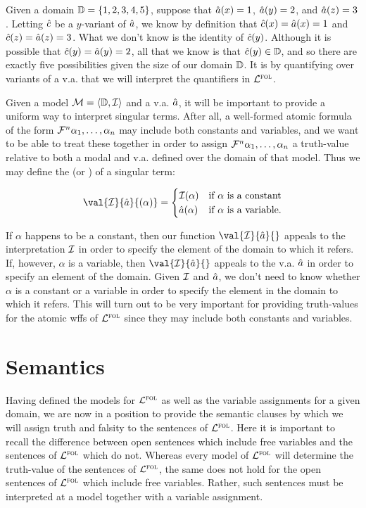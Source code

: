 Given a domain $\mathbb{D}=\lbrace1,2,3,4,5\rbrace$, suppose that $\hat{a}(x)=1$, $\hat{a}(y)=2$, and $\hat{a}(z)=3$.
Letting $\hat{c}$ be a $y$-variant of $\hat{a}$, we know by definition that $\hat{c}(x)=\hat{a}(x)=1$ and $\hat{c}(z)=\hat{a}(z)=3$.
What we don't know is the identity of $\hat{c}(y)$.
Although it is possible that $\hat{c}(y)=\hat{a}(y)=2$, all that we know is that $\hat{c}(y)\in\mathbb{D}$, and so there are exactly five possibilities given the size of our domain $\mathbb{D}$.
It is by quantifying over variants of a v.a. that we will interpret the quantifiers in $\mathcal{L}^{\textsc{fol}}$.

Given a model $\mathcal{M}=\langle\mathbb{D},\mathcal{I}\rangle$ and a v.a. $\hat{a}$, it will be important to provide a uniform way to interpret singular terms.
After all, a well-formed atomic formula of the form $\mathcal{F}^n\alpha_1,\ldots,\alpha_n$ may include both constants and variables, and we want to be able to treat these together in order to assign $\mathcal{F}^n\alpha_1,\ldots,\alpha_n$ a truth-value relative to both a modal and v.a. defined over the domain of that model. 
Thus we may define the  (or ) of a singular term:

\begin{align*}
  \val{\I}{\va{a}}{(\alpha)}=
    \begin{cases}
      \I(\alpha) & \text{if } \alpha \text{ is a constant} \\
      \va{a}(\alpha) & \text{if } \alpha \text{ is a variable.}
    \end{cases}
\end{align*}

If $\alpha$ happens to be a constant, then our function $\val{\I}{\va{a}}{}$ appeals to the interpretation $\mathcal{I}$ in order to specify the element of the domain to which it refers. 
If, however, $\alpha$ is a variable, then $\val{\I}{\va{a}}{}$ appeals to the v.a. $\hat{a}$ in order to specify an element of the domain.
Given $\mathcal{I}$ and $\hat{a}$, we don't need to know whether $\alpha$ is a constant or a variable in order to specify the element in the domain to which it refers.
This will turn out to be very important for providing truth-values for the atomic wffs of $\mathcal{L}^{\textsc{fol}}$ since they may include both constants and variables.





\section{Semantics}

Having defined the models for $\mathcal{L}^{\textsc{fol}}$ as well as the variable assignments for a given domain, we are now in a position to provide the semantic clauses by which we will assign truth and falsity to the sentences of $\mathcal{L}^{\textsc{fol}}$.
Here it is important to recall the difference between open sentences which include free variables and the sentences of $\mathcal{L}^{\textsc{fol}}$ which do not.
Whereas every model of $\mathcal{L}^{\textsc{fol}}$ will determine the truth-value of the sentences of $\mathcal{L}^{\textsc{fol}}$, the same does not hold for the open sentences of $\mathcal{L}^{\textsc{fol}}$ which include free variables.
Rather, such sentences must be interpreted at a model together with a variable assignment.


